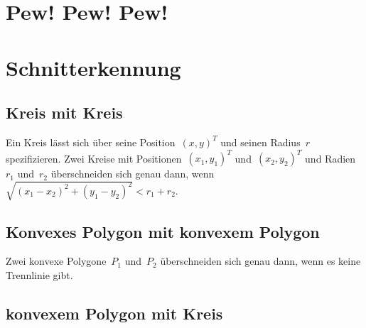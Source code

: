 \documentclass{article}
\begin{document}
\section{Pew! Pew! Pew!}

\section{Schnitterkennung}
\subsection{Kreis mit Kreis}
Ein Kreis lässt sich über seine Position~$(x, y)^{T}$
und seinen Radius~$r$ spezifizieren.
Zwei Kreise mit Positionen~$(x_{1}, y_{1})^{T}$ und~$(x_{2}, y_{2})^{T}$
und Radien~$r_{1}$ und~$r_{2}$ überschneiden sich genau dann,
wenn $\sqrt{(x_{1} - x_{2})^{2} + (y_{1} - y_{2})^{2}} < r_{1} + r_{2}$.

\subsection{Konvexes Polygon mit konvexem Polygon}
Zwei konvexe Polygone~$P_{1}$ und~$P_{2}$ überschneiden sich genau dann,
wenn es keine Trennlinie gibt.

\subsection{konvexem Polygon mit Kreis}


\end{document}
